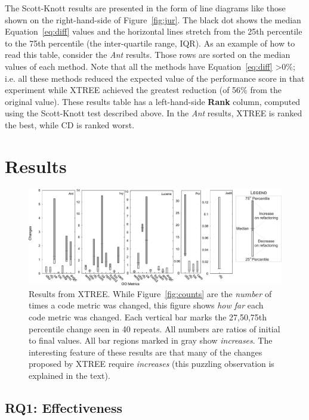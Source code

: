 \documentclass[twocolumn,5p]{elsarticle}
\newcommand{\fig}[1]{Figure~\ref{fig:#1}}
\newcommand{\eq}[1]{Equation~\ref{eq:#1}}
\theoremstyle{break}
\begin{document}
\begin{itemize}
		The Scott-Knott  results are presented in the form of line diagrams like those shown on the right-hand-side of \fig{jur}.
		The black dot shows the median \eq{diff} values and the horizontal lines stretch 
		from the 25th percentile to the 75th percentile (the inter-quartile range, IQR).
		As an example of how to read this table, consider the {\em Ant}
		results. Those rows are  sorted on the median values of each method. Note that all the methods have \eq{diff} \textgreater $ 0\%$; i.e. all these methods reduced the expected value of the performance score in that experiment while XTREE achieved the greatest reduction (of 56\% from the original value).
		These results table has a  left-hand-side  {\bf Rank} column, computed using the
		Scott-Knott test described above. In the {\em Ant}
		results, XTREE is ranked the best, while CD is  ranked   worst.
		
		
		\section{Results}
		
		
		\begin{figure}[!t]
			\centering
			\includegraphics[width=\linewidth]{figs/changes01.png}
			\caption{Results  from XTREE.
				While \fig{counts} are the {\em number} of times a code metric was changed,
				this  figure shows {\em how far} each code metric was changed. Each vertical bar
				marks the 27,50,75th percentile change seen in 40 repeats.
				All numbers are ratios of initial to final values.
				All bar regions marked in gray show {\em increases}.
				The interesting feature of these results are that many
				of the changes proposed by XTREE require {\em increases}
				(this puzzling observation is explained in the text).}
			\label{fig:changes}
		\end{figure}
		
		
		
		\subsection{RQ1: Effectiveness}
		

\end{itemize}
\end{document}
